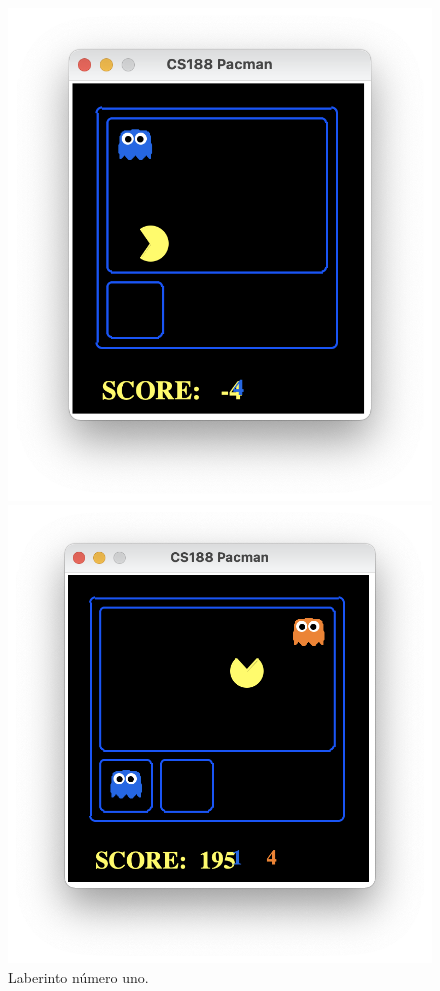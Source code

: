 \documentclass[11pt]{exam}
\begin{document}
\begin{figure}[H]
	\begin{minipage}[c]{0.35\linewidth}
		\includegraphics[scale=0.35]{lab1}
		\vspace*{-7mm}
		\caption{Laberinto número uno.}
		\label{lab1}
	\end{minipage}
	\hfill
	\begin{minipage}[c]{0.35\linewidth}
		\includegraphics[scale=0.35]{lab2}

\end{minipage}
\end{figure}
\end{document}
